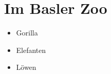 \section{Im Basler Zoo}

\begin{itemize}
 
\item Gorilla
 
\item Elefanten
 
\item Löwen

\end{itemize}
   

